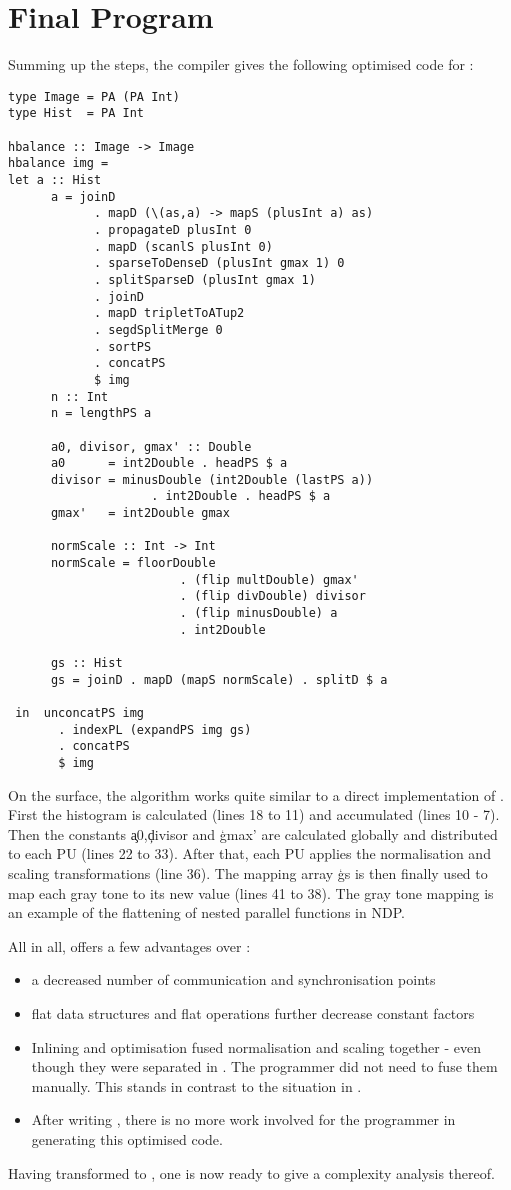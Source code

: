 \section{Final Program}
  Summing up the steps, the compiler gives the following optimised code for \ndpv:
  \begin{lstlisting}
type Image = PA (PA Int)
type Hist  = PA Int

hbalance :: Image -> Image
hbalance img =
let a :: Hist
      a = joinD
            . mapD (\(as,a) -> mapS (plusInt a) as)
            . propagateD plusInt 0
            . mapD (scanlS plusInt 0)
            . sparseToDenseD (plusInt gmax 1) 0
            . splitSparseD (plusInt gmax 1)
            . joinD
            . mapD tripletToATup2
            . segdSplitMerge 0
            . sortPS
            . concatPS
            $ img
      n :: Int
      n = lengthPS a
      
      a0, divisor, gmax' :: Double
      a0      = int2Double . headPS $ a
      divisor = minusDouble (int2Double (lastPS a))
                    . int2Double . headPS $ a
      gmax'   = int2Double gmax
      
      normScale :: Int -> Int
      normScale = floorDouble
                        . (flip multDouble) gmax'
                        . (flip divDouble) divisor
                        . (flip minusDouble) a
                        . int2Double
        
      gs :: Hist
      gs = joinD . mapD (mapS normScale) . splitD $ a
      
 in  unconcatPS img
       . indexPL (expandPS img gs)
       . concatPS
       $ img
  \end{lstlisting} %
  On the surface, the algorithm works quite similar to a direct implementation of \ndpn.
  First the histogram is calculated (lines 18 to 11) and accumulated (lines 10 - 7).
  Then the constants \c{a0},\c{divisor} and \c{gmax'} are calculated globally and distributed
  to each PU (lines 22 to 33). After that, each PU applies the normalisation and scaling transformations (line 36).
  The mapping array \c{gs} is then finally used to map each gray tone to its new value (lines 41 to 38).
  The gray tone mapping is an example of the flattening of nested parallel functions in NDP.
  
  All in all, \ndpv offers a few advantages over \ndpn:
  \begin{itemize}
    \item a decreased number of communication and synchronisation points
    \item flat data structures and flat operations further decrease constant factors
    \item Inlining and optimisation fused
          normalisation and scaling together - even though
          they were separated in \ndpn. The programmer did not
          need to fuse them manually. This stands in contrast to the situation in \man.
    \item After writing \ndpn, there is no more work involved for the programmer in generating this optimised code.
  \end{itemize}
  Having transformed \ndpn to \ndpv,
  one is now ready to give a complexity analysis thereof.
  
